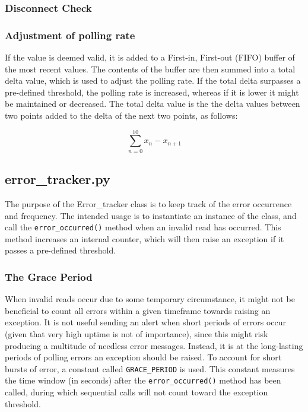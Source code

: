 \subsubsection{Disconnect Check}


\subsubsection{Adjustment of polling rate}
If the value is deemed valid, it is added to a First-in, First-out (FIFO) buffer of the most recent values. The contents of the buffer are then summed into a total delta value, which is used to adjust the polling rate. If the total delta surpasses a pre-defined threshold, the polling rate is increased, whereas if it is lower it might be maintained or decreased. The total delta value is the the delta values between two points added to the delta of the next two points, as follows:

$$\sum_{n=0}^{10} x_n - x_{n+1}$$


\subsection{error\_tracker.py}
The purpose of the Error\_tracker class is to keep track of the error occurrence and frequency. The intended usage is to instantiate an instance of the class, and call the \lstinline{error_occurred()} method when an invalid read has occurred. This method increases an internal counter, which will then raise an exception if it passes a pre-defined threshold.

\subsubsection{The Grace Period}
When invalid reads occur due to some temporary circumstance, it might not be beneficial to count all errors within a given timeframe towards raising an exception. It is not useful sending an alert when short periods of errors occur (given that very high uptime is not of importance), since this might risk producing a multitude of needless error messages. Instead, it is at the long-lasting periods of polling errors an exception should be raised. To account for short bursts of error, a constant called \lstinline{GRACE_PERIOD} is used. This constant measures the time window (in seconds) after the \lstinline{error_occurred()} method has been called, during which sequential calls  will not count toward the exception threshold.

